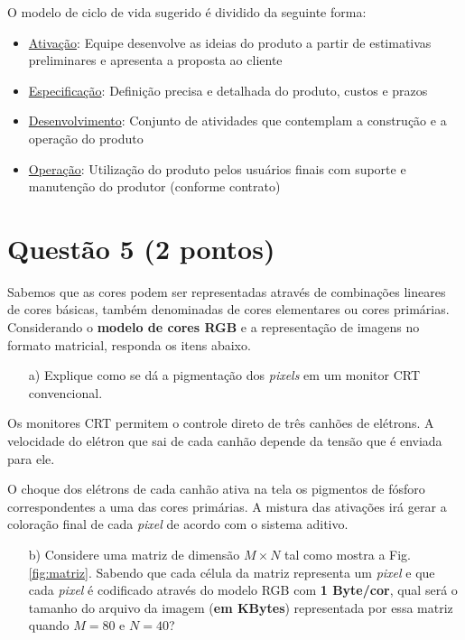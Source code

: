 \documentclass[a4paper,11pt]{article}
\begin{document}
O modelo de ciclo de vida sugerido é dividido da seguinte forma:

\begin{itemize}
    \item \uline{Ativação}: Equipe desenvolve as ideias do produto a partir de
estimativas preliminares e apresenta a proposta ao cliente
    \item \uline{Especificação}: Definição precisa e detalhada do produto,
custos e prazos
    \item \uline{Desenvolvimento}: Conjunto de atividades que contemplam a
construção e a operação do produto
    \item \uline{Operação}: Utilização do produto pelos usuários finais com
suporte e manutenção do produtor (conforme contrato)
\end{itemize}

\pagebreak

\section*{Questão 5 (2 pontos)}
Sabemos que as cores podem ser representadas através de combinações lineares de
cores básicas, também denominadas de cores elementares ou cores primárias.
Considerando o {\bf modelo de cores RGB} e a representação de imagens no formato
matricial, responda os itens abaixo.

\begin{itemize}
    \item[a)] Explique como se dá a pigmentação dos {\it pixels} em um monitor
CRT convencional.
\end{itemize}

Os monitores CRT permitem o controle direto de três canhões de elétrons. A
velocidade do elétron que sai de cada canhão depende da tensão que é enviada
para ele.

O choque dos elétrons de cada canhão ativa na tela os pigmentos de fósforo
correspondentes a uma das cores primárias. A mistura das ativações irá gerar a
coloração final de cada {\it pixel} de acordo com o sistema aditivo.

\begin{itemize}
    \item[b)] Considere uma matriz de dimensão $M \times N$ tal como mostra a
Fig. \ref{fig:matriz}. Sabendo que cada célula da matriz representa um {\it
pixel} e que cada {\it pixel} é codificado através do modelo RGB com {\bf 1
Byte/cor}, qual será o tamanho do arquivo da imagem ({\bf em KBytes})
representada por essa matriz quando $M = 80$ e $N = 40$?
\end{itemize}
\end{document}
